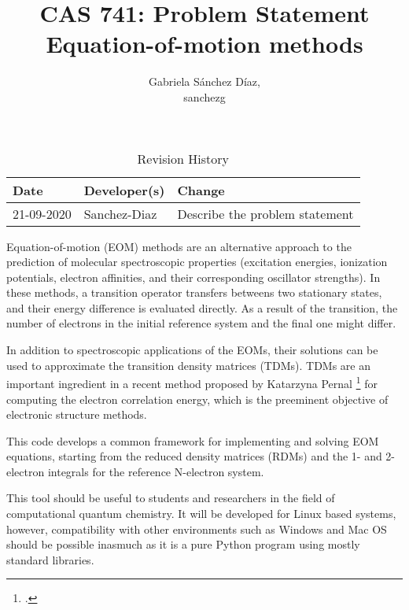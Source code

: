 \documentclass{article}
\title{CAS 741: Problem Statement\\Equation-of-motion methods}
\author{Gabriela S\'anchez D\'iaz,\\ sanchezg}
\date{}
\begin{document}
\maketitle

\begin{table}[hp]
\caption{Revision History} \label{TblRevisionHistory}
\begin{tabularx}{\textwidth}{llX}
\toprule
\textbf{Date} & \textbf{Developer(s)} & \textbf{Change}\\
\midrule
21-09-2020 & Sanchez-Diaz & Describe the problem statement\\
\bottomrule
\end{tabularx}
\end{table}

Equation-of-motion (EOM) methods are an alternative approach to the prediction 
of molecular spectroscopic properties (excitation energies, ionization 
potentials, electron affinities, and their corresponding oscillator strengths). 
In these methods, a transition operator transfers betweens two stationary 
states, and their energy difference is evaluated directly. As a result of the 
transition, the number of electrons in the initial reference system and the 
final one might differ.

In addition to spectroscopic applications of the EOMs, their solutions can be 
used to approximate the transition density matrices (TDMs). TDMs are an 
important ingredient in a recent method proposed by Katarzyna 
Pernal \footcite{Pernal2018} for computing the electron correlation energy, 
which is the preeminent objective of electronic structure methods.  

This code develops a common framework for implementing and solving EOM 
equations, starting from the reduced density matrices (RDMs) and the 1- and 
2-electron integrals for the reference N-electron system. 

This tool should be useful to students and researchers in the field of 
computational quantum chemistry. It will be developed for Linux based systems, 
however, compatibility with other environments such as Windows and Mac OS 
should be possible inasmuch as it is a pure Python program using mostly 
standard libraries.
\end{document}
